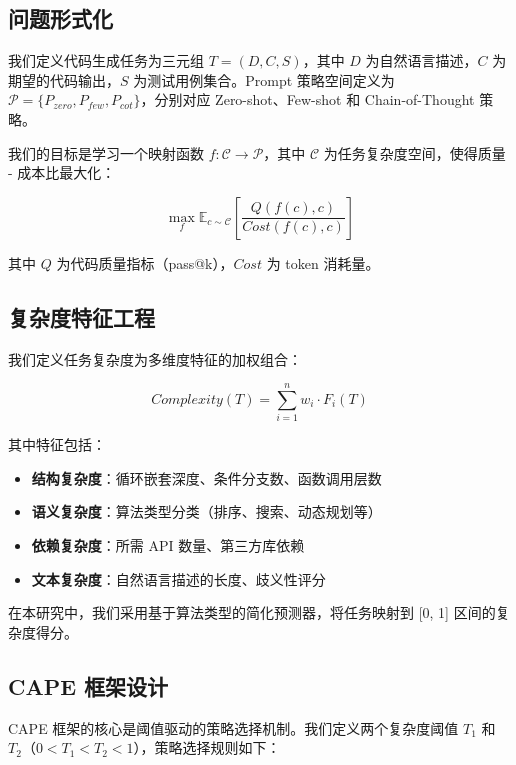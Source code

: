 \documentclass[11pt,a4paper]{article}
\begin{document}
\subsection{问题形式化}

我们定义代码生成任务为三元组 $T = (D, C, S)$，其中 $D$ 为自然语言描述，$C$ 为期望的代码输出，$S$ 为测试用例集合。Prompt 策略空间定义为 $\mathcal{P} = \{P_{zero}, P_{few}, P_{cot}\}$，分别对应 Zero-shot、Few-shot 和 Chain-of-Thought 策略。

我们的目标是学习一个映射函数 $f: \mathcal{C} \rightarrow \mathcal{P}$，其中 $\mathcal{C}$ 为任务复杂度空间，使得质量 - 成本比最大化：

\begin{equation}
\max_{f} \mathbb{E}_{c \sim \mathcal{C}} \left[ \frac{Q(f(c), c)}{Cost(f(c), c)} \right]
\end{equation}

其中 $Q$ 为代码质量指标（pass@k），$Cost$ 为 token 消耗量。

\subsection{复杂度特征工程}

我们定义任务复杂度为多维度特征的加权组合：

\begin{equation}
Complexity(T) = \sum_{i=1}^{n} w_i \cdot F_i(T)
\end{equation}

其中特征包括：
\begin{itemize}[leftmargin=*]
    \item \textbf{结构复杂度}：循环嵌套深度、条件分支数、函数调用层数
    \item \textbf{语义复杂度}：算法类型分类（排序、搜索、动态规划等）
    \item \textbf{依赖复杂度}：所需 API 数量、第三方库依赖
    \item \textbf{文本复杂度}：自然语言描述的长度、歧义性评分
\end{itemize}

在本研究中，我们采用基于算法类型的简化预测器，将任务映射到 [0, 1] 区间的复杂度得分。

\subsection{CAPE 框架设计}

CAPE 框架的核心是阈值驱动的策略选择机制。我们定义两个复杂度阈值 $T_1$ 和 $T_2$（$0 < T_1 < T_2 < 1$），策略选择规则如下：
\end{document}

